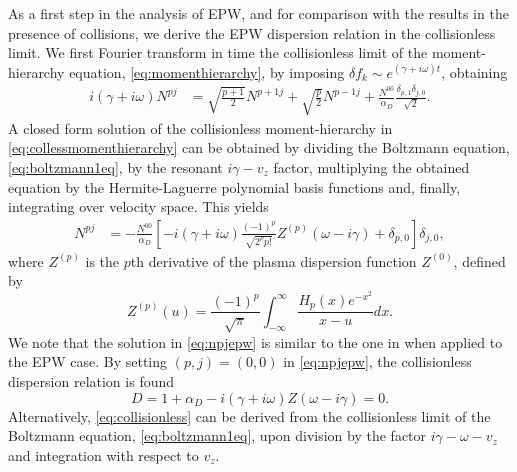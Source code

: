 As a first step in the analysis of EPW, and for comparison with the results {in the presence of collisions}, we derive the EPW dispersion relation in the collisionless limit.
%
We first Fourier transform in time the collisionless limit of the moment-hierarchy equation, \cref{eq:momenthierarchy}, by imposing $\delta f_k \sim e^{(\gamma+i \omega) t}$, obtaining
%
\begin{align}
    i (\gamma+i \omega) N^{pj} &= \sqrt{\frac{p+1}{2}}N^{p+1 j}+\sqrt{\frac{p}{2}}N^{p-1 j}+ \frac{N^{00}}{\alpha_D}\frac{\delta_{p,1}\delta_{j,0}}{\sqrt{2}}.
\label{eq:collessmomenthierarchy}
\end{align}
%
A closed form solution of the collisionless moment-hierarchy in \cref{eq:collessmomenthierarchy} can be obtained by dividing the Boltzmann equation, \cref{eq:boltzmann1eq}, by the resonant $i \gamma-v_z$ factor, multiplying the obtained equation by the Hermite-Laguerre polynomial basis functions and, finally, integrating over velocity space.
%
This yields
%
\begin{align}
    {N^{pj}}&=-\frac{N^{00}}{\alpha_D}\left[-i(\gamma+i\omega)\frac{(-1)^p}{\sqrt{2^p p!}}Z^{(p)}\left(\omega-i \gamma\right) + \delta_{p,0}\right]\delta_{j,0},
\label{eq:npjepw}
\end{align}
%
where $Z^{(p)}$ is the $p$th derivative of the plasma dispersion function $Z^{(0)}$, defined by
%
\begin{equation}
    Z^{(p)}(u)=\frac{(-1)^p}{\sqrt{\pi}}\int_{-\infty}^{\infty}\frac{H_p(x)e^{-x^2}}{x-u}dx.
    \label{eq:derznint}
\end{equation}
%
We note that the solution in \cref{eq:npjepw} is similar to the one in \citet{Kanekar2015} when applied to the EPW case.
%
By setting $(p,j)=(0,0)$ in \cref{eq:npjepw},  the collisionless dispersion relation is found
%
\begin{equation}
    D=1+\alpha_D-i(\gamma+i \omega) Z(\omega-i\gamma)=0.
\label{eq:collisionless}
\end{equation}
%
{Alternatively, \cref{eq:collisionless} can be derived from the collisionless limit of the Boltzmann equation, \cref{eq:boltzmann1eq}, upon division by the factor $i\gamma-\omega-v_z$ and integration with respect to $v_z$.}


